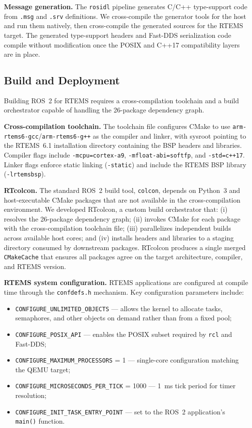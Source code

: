\textbf{Message generation.}
The \texttt{rosidl} pipeline generates C/C++ type-support code from \texttt{.msg} and \texttt{.srv} definitions.
We cross-compile the generator tools for the host and run them natively, then cross-compile the generated sources for the RTEMS target.
The generated type-support headers and Fast-DDS serialization code compile without modification once the POSIX and C++17 compatibility layers are in place.

\subsection{Build and Deployment}
\label{subsec:build}

Building ROS~2 for RTEMS requires a cross-compilation toolchain and a build orchestrator capable of handling the 26-package dependency graph.

\textbf{Cross-compilation toolchain.}
The toolchain file configures CMake to use \texttt{arm-rtems6-gcc}/\texttt{arm-rtems6-g++} as the compiler and linker, with sysroot pointing to the RTEMS~6.1 installation directory containing the BSP headers and libraries.
Compiler flags include \texttt{-mcpu=cortex-a9}, \texttt{-mfloat-abi=softfp}, and \texttt{-std=c++17}.
Linker flags enforce static linking (\texttt{-static}) and include the RTEMS BSP library (\texttt{-lrtemsbsp}).

\textbf{RTcolcon.}
The standard ROS~2 build tool, \texttt{colcon}, depends on Python~3 and host-executable CMake packages that are not available in the cross-compilation environment.
We developed RTcolcon, a custom build orchestrator that:
(i) resolves the 26-package dependency graph;
(ii) invokes CMake for each package with the cross-compilation toolchain file;
(iii) parallelizes independent builds across available host cores;
and (iv) installs headers and libraries to a staging directory consumed by downstream packages.
RTcolcon produces a single merged \texttt{CMakeCache} that ensures all packages agree on the target architecture, compiler, and RTEMS version.

\textbf{RTEMS system configuration.}
RTEMS applications are configured at compile time through the \texttt{confdefs.h} mechanism.
Key configuration parameters include:
\begin{itemize}
    \item \texttt{CONFIGURE\_UNLIMITED\_OBJECTS} --- allows the kernel to allocate tasks, semaphores, and other objects on demand rather than from a fixed pool;
    \item \texttt{CONFIGURE\_POSIX\_API} --- enables the POSIX subset required by \texttt{rcl} and Fast-DDS;
    \item \texttt{CONFIGURE\_MAXIMUM\_PROCESSORS} = 1 --- single-core configuration matching the QEMU target;
    \item \texttt{CONFIGURE\_MICROSECONDS\_PER\_TICK} = 1000 --- 1~ms tick period for timer resolution;
    \item \texttt{CONFIGURE\_INIT\_TASK\_ENTRY\_POINT} --- set to the ROS~2 application's \texttt{main()} function.
\end{itemize}

